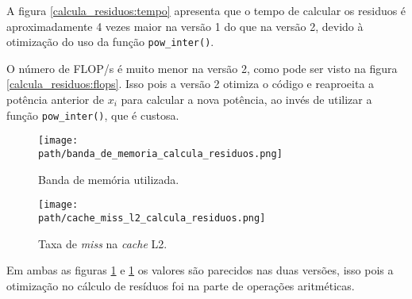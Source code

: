 \documentclass[a4paper, 11pt]{article}
\begin{document}
A figura \ref{calcula_residuos:tempo} apresenta que o tempo de calcular os residuos é aproximadamente 4 vezes maior na versão 1 do que na versão 2, devido à otimização do uso da função \texttt{pow\_inter()}.

O número de FLOP/s é muito menor na versão 2, como pode ser visto na figura \ref{calcula_residuos:flops}. Isso pois a versão 2 otimiza o código e reaproeita a potência anterior de $x_i$ para calcular a nova potência, ao invés de utilizar a função \texttt{pow\_inter()}, que é custosa.

\begin{figure}[H]
    \centering
    \begin{minipage}{.5\textwidth}
        \centering
        \texttt{[image: \\path/banda\_de\_memoria\_calcula\_residuos.png]}
        \caption{Banda de memória utilizada.}
        \label{calcula_residuos:banda}
    \end{minipage}\hfill
    \begin{minipage}{.5\textwidth}
        \centering
        \texttt{[image: \\path/cache\_miss\_l2\_calcula\_residuos.png]}
        \caption{Taxa de \textit{miss} na \textit{cache} L2.}
        \label{calcula_residuos:cache_miss}
    \end{minipage}
\end{figure}

Em ambas as figuras \ref{calcula_residuos:cache_miss} e \ref{calcula_residuos:cache_miss} os valores são parecidos nas duas versões, isso pois a otimização no cálculo de resíduos foi na parte de operações aritméticas.
\end{document}
